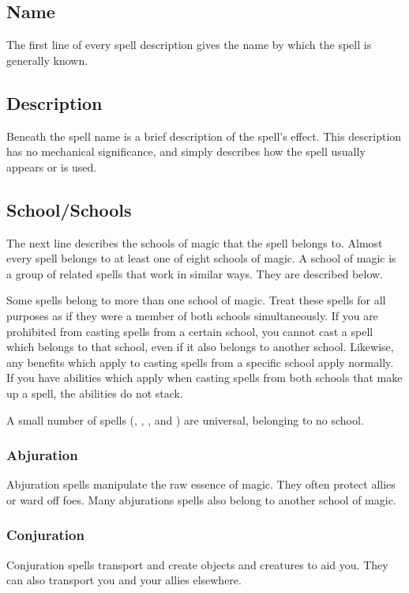 \subsection{Name}
The first line of every spell description gives the name by which the spell is generally known.

\subsection{Description}
Beneath the spell name is a brief description of the spell's effect. This description has no mechanical significance, and simply describes how the spell usually appears or is used.

\subsection{School/Schools}
The next line describes the schools of magic that the spell belongs to. Almost every spell belongs to at least one of eight schools of magic. A school of magic is a group of related spells that work in similar ways. They are described below.

Some spells belong to more than one school of magic. Treat these spells for all purposes as if they were a member of both schools simultaneously. If you are prohibited from casting spells from a certain school, you cannot cast a spell which belongs to that school, even if it also belongs to another school. Likewise, any benefits which apply to casting spells from a specific school apply normally. If you have abilities which apply when casting spells from both schools that make up a spell, the abilities do not stack.

A small number of spells (, , , and ) are universal, belonging to no school.

\subsubsection{Abjuration}
Abjuration spells manipulate the raw essence of magic. They often protect allies or ward off foes. Many abjurations spells also belong to another school of magic.

\subsubsection{Conjuration}
Conjuration spells transport and create objects and creatures to aid you. They can also transport you and your allies elsewhere.

